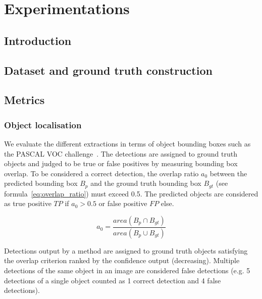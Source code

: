 \chapter{Experimentations}
\label{chap:experimentations}
\graphicspath{{./chapters/6-experiments/figs/}}

\section{Introduction} %
\label{sec:ex:introduction}


\section{Dataset and ground truth construction} %
\label{sec:dataset_and_ground_truth_construction}


\section{Metrics} %
\label{sec:ex:metrics}
\subsection{Object localisation} %
\label{sub:object_localisation}


We evaluate the different extractions in terms of object bounding boxes such as the PASCAL VOC challenge~\cite{everingham2010pascal}.
The detections are assigned to ground truth objects and judged to be true or false positives by measuring bounding box overlap.
To be considered a correct detection, the overlap ratio $a_0$ between the predicted bounding box $B_p$ and the ground truth bounding box $B_{gt}$ (see formula~\ref{eq:overlap_ratio}) must exceed 0.5.
The predicted objects are considered as true positive $TP$ if $a_0 > 0.5$ or false positive $FP$ else.

\begin{equation}
\label{eq:overlap_ratio}
  a_0 = \frac{area(B_p \cap B_{gt})}{area(B_p \cup B_{gt})}
\end{equation}

Detections output by a method are assigned to ground truth objects satisfying the overlap criterion ranked by the confidence output (decreasing).
Multiple detections of the same object in an image are considered false detections (e.g. 5 detections of a single object counted as 1 correct detection and 4 false detections).

